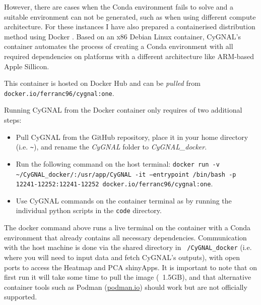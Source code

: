 
However, there are cases when the Conda environment fails to solve and a suitable environment can not be generated, such as when using different compute architecture. For these instances I have also prepared a containerised distribution method using Docker \cite{merkel_docker_2014}. Based on an x86 Debian Linux container, CyGNAL's container automates the process of creating a Conda environment with all required dependencies on platforms with a different architecture like ARM-based Apple Sillicon.

This container is hosted on Docker Hub and can be \emph{pulled} from \texttt{docker.io/ferranc96/cygnal:one}.

Running CyGNAL from the Docker container only requires of two additional steps:

\begin{itemize}

\item Pull CyGNAL from the GitHub repository, place it in your home directory (i.e. \texttt{\textasciitilde}), and rename the \emph{CyGNAL} folder to \emph{CyGNAL\_docker}. 

\item Run the following command on the host terminal:\newline
\texttt{docker run -v \textasciitilde/CyGNAL\_docker/:/usr/app/CyGNAL -it\newline
--entrypoint /bin/bash -p 12241-12252:12241-12252\newline
docker.io/ferranc96/cygnal:one}. 

\item Use CyGNAL commands on the container terminal as by running the individual python scripts in the \texttt{code} directory.

\end{itemize}

The docker command above runs a live terminal on the container with a Conda environment that already contains all necessary dependencies. Communication with the host machine is done via the shared directory in \texttt{~/CyGNAL\_docker} (i.e. where you will need to input data and fetch CyGNAL's outputs), with open ports to access the Heatmap and PCA shinyApps. 
It is important to note that on first run it will take some time to pull the image (~1.5GB), and that alternative container tools such as Podman (\url{podman.io}) should work but are not officially supported.

